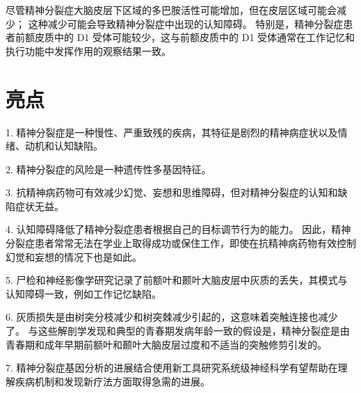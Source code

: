 尽管精神分裂症大脑皮层下区域的多巴胺活性可能增加，但在皮层区域可能会减少； 这种减少可能会导致精神分裂症中出现的认知障碍。 特别是，精神分裂症患者前额皮质中的 D1 受体可能较少，这与前额皮质中的 D1 受体通常在工作记忆和执行功能中发挥作用的观察结果一致。


\section{亮点}

1. 精神分裂症是一种慢性、严重致残的疾病，其特征是剧烈的精神病症状以及情绪、动机和认知缺陷。 

2. 精神分裂症的风险是一种遗传性多基因特征。 

3. 抗精神病药物可有效减少幻觉、妄想和思维障碍，但对精神分裂症的认知和缺陷症状无益。 

4. 认知障碍降低了精神分裂症患者根据自己的目标调节行为的能力。 因此，精神分裂症患者常常无法在学业上取得成功或保住工作，即使在抗精神病药物有效控制幻觉和妄想的情况下也是如此。 

5. 尸检和神经影像学研究记录了前额叶和颞叶大脑皮层中灰质的丢失，其模式与认知障碍一致，例如工作记忆缺陷。 

6. 灰质损失是由树突分枝减少和树突棘减少引起的，这意味着突触连接也减少了。 与这些解剖学发现和典型的青春期发病年龄一致的假设是，精神分裂症是由青春期和成年早期前额叶和颞叶大脑皮层过度和不适当的突触修剪引发的。 

7. 精神分裂症基因分析的进展结合使用新工具研究系统级神经科学有望帮助在理解疾病机制和发现新疗法方面取得急需的进展。


